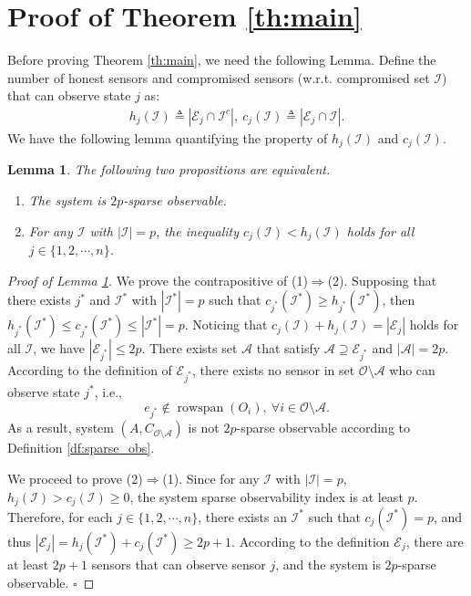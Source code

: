 \documentclass[12pt]{article}  %
\newcommand{\Ec}{{\mathcal{E}}} %
\newcommand{\Ac}{{\mathcal{A}}}
\newcommand{\Ic}{{\mathcal{I}}}
\newcommand{\Oc}{{\mathcal{O}}}
\DeclareMathOperator{\rs}{{rowspan}}
\newtheorem{lemma}{\textbf{Lemma}}
\newtheorem*{proof}{\textbf{Proof}}
\begin{document}
\section{Proof of Theorem \ref{th:main}}\label{ap:main}
Before proving Theorem \ref{th:main}, we need the following Lemma.
Define the number of honest sensors and compromised sensors (w.r.t. compromised set $\Ic$) that can observe state $j$ as:
\begin{align*}
h_j(\Ic)\triangleq |\Ec_j\cap \Ic^c|, \
c_j(\Ic)\triangleq |\Ec_j\cap \Ic|.
\end{align*}
We have the following lemma quantifying the property of $h_j(\Ic)$ and $c_j(\Ic)$.  
\begin{lemma}\label{lm:cj<hj}
	The following two propositions are equivalent.
	\begin{enumerate}
		\item The system is $2p$-sparse observable.
		\item For any $\Ic$ with $|\Ic|=p$, the inequality $c_j(\Ic)<h_j(\Ic)$ holds for all $j\in\{1,2,\cdots,n\}$.
	\end{enumerate}
\end{lemma}
\begin{proof}[Proof of Lemma \ref{lm:cj<hj}]
	We prove the contrapositive of (1)$\Rightarrow$(2). Supposing that there exists $j^*$ and $\Ic^*$ with $|\Ic^*|=p$ such that $ c_{j^*}(\Ic^*)\geq h_{j^*}(\Ic^*)$, then
	$h_{j^*}(\Ic^*)\leq c_{j^*}(\Ic^*)\leq |\Ic^*|=p$. Noticing that $c_j(\Ic)+h_j(\Ic)=|\Ec_j|$ holds for all $\Ic$, we have $|\Ec_{j^*}|\leq 2p$. 
	There exists set $\Ac$ that satisfy $\Ac\supseteq\Ec_{j^*}$ and $|\Ac|=2p$.
	According to the definition of $\Ec_{j^*}$, there exists no sensor in set $\Oc\setminus \Ac$ who can observe state $j^*$, i.e.,
	\begin{equation*}
	e_{j^*}\notin \rs(O_i),\ \forall i\in\Oc\setminus \Ac.
	\end{equation*}
	As a result, system $(A,C_{\Oc\setminus\Ac})$ is not $2p$-sparse observable according to Definition \ref{df:sparse_obs}. 
	
	We proceed to prove (2)$\Rightarrow$(1). 
	Since for any $\Ic$ with $|\Ic|=p$, $h_j(\Ic)>c_j(\Ic)\geq 0$, the system sparse observability index is at least $p$. Therefore, for each $j\in\{1,2,\cdots,n\}$, there exists an $\Ic^*$ such that $c_j(\Ic^*)=p$, and thus $|\Ec_j|=h_j(\Ic^*)+c_j(\Ic^*)\geq 2p+1$. According to the definition $\Ec_j$, there are at least $2p+1$ sensors that can observe sensor $j$, and the system is $2p$-sparse observable.	
	$\square$
\end{proof}
\end{document}
